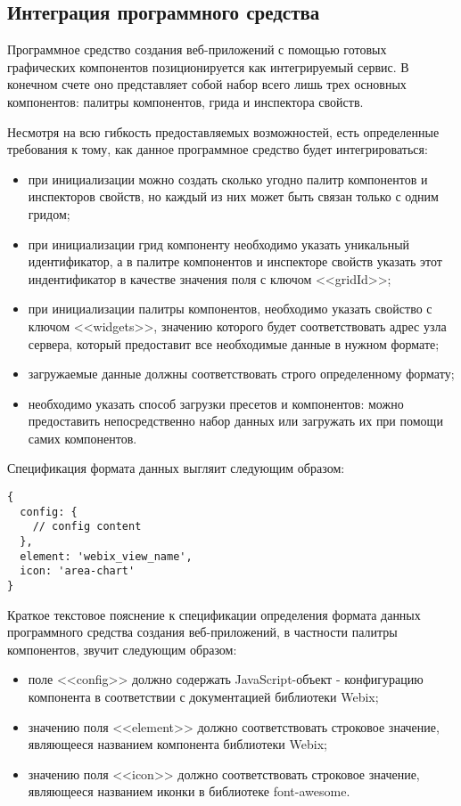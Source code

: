 \subsection{Интеграция программного средства}
\label{sec:manual:integration}

Программное средство создания веб-приложений с помощью готовых графических компонентов позиционируется как интегрируемый сервис. В конечном счете оно представляет собой набор всего лишь трех основных компонентов: палитры компонентов, грида и инспектора свойств. 

Несмотря на всю гибкость предоставляемых возможностей, есть определенные требования к тому, как данное программное средство будет интегрироваться:
\begin{itemize}
	\item при инициализации можно создать сколько угодно палитр компонентов и инспекторов свойств, но каждый из них может быть связан только с одним гридом;
	\item при инициализации грид компоненту необходимо указать уникальный идентификатор, а в палитре компонентов и инспекторе свойств указать этот индентификатор в качестве значения поля с ключом <<gridId>>;
	\item при инициализации палитры компонентов, необходимо указать свойство с ключом <<widgets>>, значению которого будет соответствовать адрес узла сервера, который предоставит все необходимые данные в нужном формате;
	\item загружаемые данные должны соответствовать строго определенному формату;
	\item необходимо указать способ загрузки пресетов и компонентов: можно предоставить непосредственно набор данных или загружать их при помощи самих компонентов. 
\end{itemize}

Спецификация формата данных выгляит следующим образом:
\begin{lstlisting}
{
  config: { 
    // config content
  },
  element: 'webix_view_name',
  icon: 'area-chart'
}
\end{lstlisting}

Краткое текстовое пояснение к спецификации определения формата данных программного средства создания веб-приложений, в частности палитры компонентов, звучит следующим образом:
\begin{itemize}
	\item поле <<config>> должно содержать JavaScript-объект - конфигурацию компонента в соответствии с документацией библиотеки Webix;
	\item значению поля <<element>> должно соответствовать строковое значение, являющееся названием компонента библиотеки Webix;
	\item значению поля <<icon>> должно соответствовать строковое значение, являющееся названием иконки в библиотеке font-awesome.
\end{itemize}

